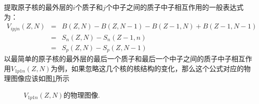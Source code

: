 提取原子核的最外层的$i$个质子和$j$个中子之间的质子中子相互作用的一般表达式为：
\begin{equation}
\begin{array}{rcl}
V_{ipjn}(Z,N)&=&B(Z,N)-B(Z,N-1)-B(Z-1,N)+B(Z-1,N-1)\\
&=&S_n(Z,N)-S_n(Z-1,n)\\
&=&S_p(Z,N)-S_p(Z,N-1)
\end{array}
\end{equation}
以最简单的原子核的最外层的最后一个质子和最后一个中子之间的质子中子相互作用$V_{1p1n}(Z,N)$为例，如果忽略这几个核的核结构的变化，那么这个公式对应的物理图像应该如图\ref{fig_V1p1n1}所示
\begin{figure}[H]
\centering
{}
\quad
\centering
{}
\caption{$V_{1p1n}(Z,N)$的物理图像.\label{fig_V1p1n1}}
\end{figure}

